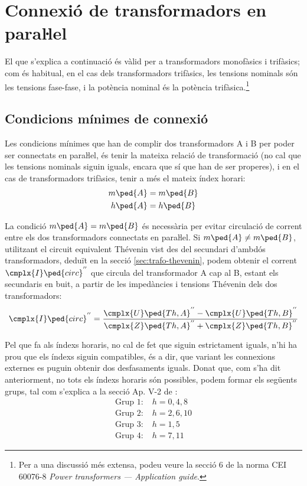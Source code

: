 \section{Connexió de transformadors en paraŀlel}

El que s'explica a continuació és vàlid per a transformadors
monofàsics i trifàsics; com és habitual, en el cas dels
transformadors trifàsics, les tensions nominals són les tensions
fase-fase, i la potència nominal és la potència trifàsica.\footnote{Per a una discussió més extensa,  podeu veure la secció 6 de la norma CEI 60076-8 \emph{Power transformers --- Application guide}.}

\subsection{Condicions mínimes de connexió}\label{sec:trafo-cond-min-connex}

Les condicions mínimes que han de complir dos transformadors A i B per poder ser connectats en paraŀlel, és tenir la mateixa relació de transformació (no cal que les tensions nominals siguin iguals, encara que sí que han de ser properes), i en el cas de transformadors trifàsics, tenir a més el mateix índex horari:
\begin{align}
    m\ped{A} &= m\ped{B}\label{eq:connex-min-1}\\
    h\ped{A} &= h\ped{B}\label{eq:connex-min-2}
\end{align}

La condició $m\ped{A} = m\ped{B}$ és necessària per evitar circulació de corrent entre els dos transformadors connectats en paraŀlel. Si $m\ped{A} \neq m\ped{B}$, utilitzant el circuit equivalent  Thévenin vist des del secundari d'ambdós transformadors, deduït en la secció \vref{sec:trafo-thevenin}, podem obtenir el corrent $\cmplx{I}\ped{circ}^{''}$ que circula del transformador A cap al B, estant els secundaris en buit, a partir de les impedàncies i tensions Thévenin dels dos transformadors:
\begin{equation}
    \cmplx{I}\ped{circ}^{''} = \frac{\cmplx{U}\ped{Th,A}^{''}-\cmplx{U}\ped{Th,B}^{''}}{\cmplx{Z}\ped{Th,A}^{''}+
    \cmplx{Z}\ped{Th,B}^{''}}
\end{equation}

Pel que fa als índexs horaris, no cal de fet que siguin estrictament iguals, n'hi ha prou  que els índexs siguin compatibles, és a dir, que variant les connexions externes es puguin obtenir dos desfasaments iguals.
Donat que, com s'ha dit anteriorment, no tots els índexs horaris són possibles, podem formar els següents grups, tal com s'explica a la secció Ap. V-2 de \cite{RASb}:
\begin{align*}
    \text{Grup 1:} & \; h=0, 4, 8 \\
    \text{Grup 2:} & \; h=2, 6, 10 \\
    \text{Grup 3:} & \; h=1, 5 \\
    \text{Grup 4:} & \; h=7, 11
\end{align*}

